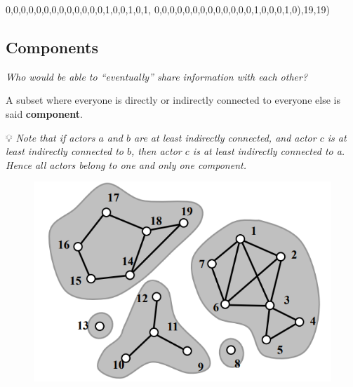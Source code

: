 \documentclass[
  notitlepage,
  onecolumn,
  openany]{book}
\newenvironment{Shaded}{\begin{snugshade}}{\end{snugshade}}
\newcommand{\DecValTok}[1]{\textcolor[rgb]{0.00,0.00,0.81}{#1}}
\newcommand{\NormalTok}[1]{#1}
\begin{document}
\begin{Shaded}
\begin{Highlighting}[]
\DecValTok{0}\NormalTok{,}\DecValTok{0}\NormalTok{,}\DecValTok{0}\NormalTok{,}\DecValTok{0}\NormalTok{,}\DecValTok{0}\NormalTok{,}\DecValTok{0}\NormalTok{,}\DecValTok{0}\NormalTok{,}\DecValTok{0}\NormalTok{,}\DecValTok{0}\NormalTok{,}\DecValTok{0}\NormalTok{,}\DecValTok{0}\NormalTok{,}\DecValTok{0}\NormalTok{,}\DecValTok{0}\NormalTok{,}\DecValTok{1}\NormalTok{,}\DecValTok{0}\NormalTok{,}\DecValTok{0}\NormalTok{,}\DecValTok{1}\NormalTok{,}\DecValTok{0}\NormalTok{,}\DecValTok{1}\NormalTok{,}
\DecValTok{0}\NormalTok{,}\DecValTok{0}\NormalTok{,}\DecValTok{0}\NormalTok{,}\DecValTok{0}\NormalTok{,}\DecValTok{0}\NormalTok{,}\DecValTok{0}\NormalTok{,}\DecValTok{0}\NormalTok{,}\DecValTok{0}\NormalTok{,}\DecValTok{0}\NormalTok{,}\DecValTok{0}\NormalTok{,}\DecValTok{0}\NormalTok{,}\DecValTok{0}\NormalTok{,}\DecValTok{0}\NormalTok{,}\DecValTok{1}\NormalTok{,}\DecValTok{0}\NormalTok{,}\DecValTok{0}\NormalTok{,}\DecValTok{0}\NormalTok{,}\DecValTok{1}\NormalTok{,}\DecValTok{0}\NormalTok{),}\DecValTok{19}\NormalTok{,}\DecValTok{19}\NormalTok{)}
\end{Highlighting}
\end{Shaded}

\hypertarget{components-1}{%
\subsection{Components}\label{components-1}}

\emph{Who would be able to ``eventually'' share information with each other?}

A subset where everyone is directly or indirectly connected to everyone else is said \textbf{component}.

💡 \emph{Note that if actors \(a\) and \(b\) are at least indirectly connected, and actor \(c\) is at least indirectly connected to \(b\), then actor \(c\) is at least indirectly connected to a. Hence all actors belong to one and only one component.}

\begin{figure}[h!]

{\centering \includegraphics[width=0.5\linewidth]{images/11-Subgroups and Structural Equivalence/Untitled} 

}

\end{figure}
\end{document}
